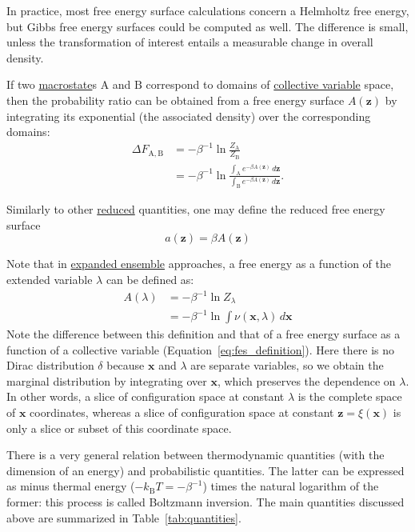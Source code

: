 \documentclass[9pt,review]{livecoms}
\newcommand{\vx}{\mathbf{x}}
\newcommand{\vz}{\mathbf{z}}
\newcommand{\A}{\mathrm{A}}
\newcommand{\B}{\mathrm{B}}
\begin{document}
In practice, most free energy surface calculations concern a Helmholtz free energy, but Gibbs free energy surfaces could be computed as well. The difference is small, unless the transformation of interest entails a measurable change in overall density.

If two \hyperlink{ref:Macrostate} {macrostate}s $\A$ and $\B$ correspond to domains of \hyperlink{ref:CV} {collective variable} space, then the probability ratio can be obtained from a free energy surface $A(\vz)$ by integrating its exponential (the associated density) over the corresponding domains:
\begin{align}
  \Delta F_{\A,\B} &=
  -\beta^{-1} \ln \frac{Z_\A}{Z_\B}\\
  & =  -\beta^{-1} \ln
  \frac{\int_\A e^{-\beta A(\vz)} \, d\vz}
  {\int_\B e^{-\beta A(\vz)} \, d\vz}.
\end{align}

Similarly to other \hyperlink{ref:reduced} {reduced} quantities, one may define the reduced free energy surface
\begin{equation}
    a(\vz) = \beta A(\vz)
\end{equation}

Note that in \hyperlink{ref:ExpEns} {expanded ensemble} approaches, a free energy as a function of the extended variable $\lambda$ can be defined as:
\begin{align}
    A(\lambda) &= -\beta^{-1} \ln Z_\lambda
    \nonumber \\
    &= -\beta^{-1} \ln \int
    \nu(\vx, \lambda)\, d\vx
\end{align}
Note the difference between this definition and that of a free energy surface as a function of a collective variable (Equation~\ref{eq:fes_definition}).
Here there is no Dirac distribution $\delta$ because $\vx$ and $\lambda$ are separate variables, so we obtain the marginal distribution by integrating over $\vx$, which preserves the dependence on $\lambda$. In other words, a slice of configuration space at constant $\lambda$ is the complete space of $\vx$ coordinates, whereas a slice of configuration space at constant $\vz = \xi(\vx)$ is only  a slice or subset of this coordinate space.

There is a very general relation between thermodynamic quantities (with the dimension of an energy) and probabilistic quantities.
The latter can be expressed as minus thermal energy ($-k_\mathrm{B} T = -\beta^{-1}$) times the natural logarithm of the former: this process is called Boltzmann inversion.
The main quantities discussed above are summarized in Table~\ref{tab:quantities}.
\end{document}
